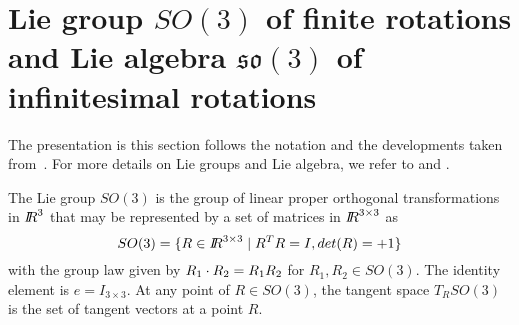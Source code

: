 
\section{ Lie group $SO(3)$ of finite rotations and Lie algebra $\mathfrak{so}(3)$ of infinitesimal rotations}
The presentation is this section follows the notation and the developments taken from~\cite{Iserles.ea_AN2000,Munthe-Kaas.BIT1998}. For more details on Lie groups and Lie algebra, we refer to \cite{Varadarajan_book1984} and \cite{Helgason_Book1978}.


The Lie group $SO(3)$ is the group of linear proper orthogonal transformations in $\mbox{\rm $I\!\!R$}^3$ that may be represented by a set of matrices in $\mbox{\rm $I\!\!R$}^{3\times 3}$ as
\begin{equation}
  \label{eq:47}
  SO(3) = \{R \in \mbox{\rm $I\!\!R$}^{3\times3}\mid R^TR=I , det(R) = +1  \}
\end{equation}
with the group law given by $R_1\cdot R_2 = R_1R_2$ for $R_1,R_2\in SO(3)$. The identity element is $e = I_{3\times 3}$. At any point of $R\in SO(3)$, the tangent space $T_RSO(3)$ is the set of tangent vectors at a point $R$.

